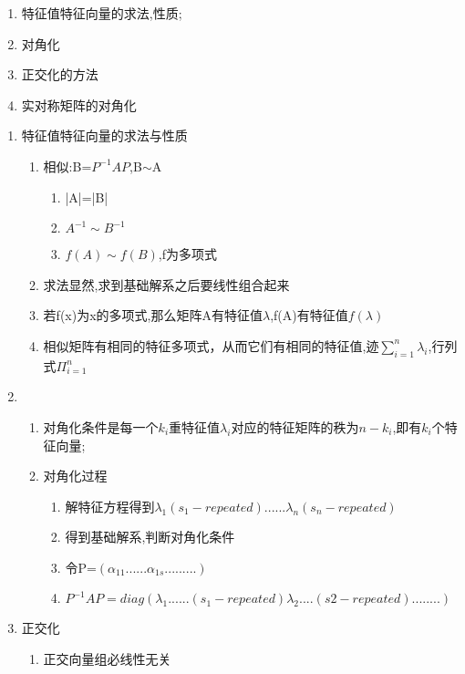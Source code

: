 \documentclass[11pt, a4paper, UTF8]{ctexart}
\begin{document}
\begin{problem}[特征值]
  \begin{enumerate}
\item 特征值特征向量的求法,性质;
\item 对角化
\item 正交化的方法
\item 实对称矩阵的对角化
  \end{enumerate}
\end{problem}
\begin{solution}
 \begin{enumerate} 
\item 特征值特征向量的求法与性质
\begin{enumerate}
  \item 相似:B=$P^{-1}AP$,B$\sim$A
  \begin{enumerate}
    \item |A|=|B|
    \item $A^{-1}\sim B^{-1}$
    \item $f(A)\sim f(B)$,f为多项式
  \end{enumerate}
  \item 求法显然,求到基础解系之后要线性组合起来
  \item 若f(x)为x的多项式,那么矩阵A有特征值$\lambda $,f(A)有特征值$f(\lambda)$
  \item 相似矩阵有相同的特征多项式，从而它们有相同的特征值,迹$\sum _{i=1}^{n} \lambda _i$,行列式$\Pi _{i=1}^{n}$
 \end{enumerate}
 \item 
 \begin{enumerate}
  \item 对角化条件是每一个$k_i$重特征值$\lambda _i$对应的特征矩阵的秩为$n-k_i$,即有$k_i$个特征向量;
  \item 对角化过程
  \begin{enumerate}
    \item 解特征方程得到$\lambda _1(s_1-repeated)......\lambda _n(s_n-repeated)$
    \item 得到基础解系,判断对角化条件
    \item 令P=$(\alpha _{11}......\alpha_{1s}.........)$
    \item $P^{-1}AP=diag(\lambda _1......(s_1-repeated)\lambda _2....(s2-repeated)........)$
  \end{enumerate}
\end{enumerate}
\item 正交化
\begin{enumerate}
  \item 正交向量组必线性无关

\end{enumerate}
\end{enumerate}
\end{solution}
\end{document}
